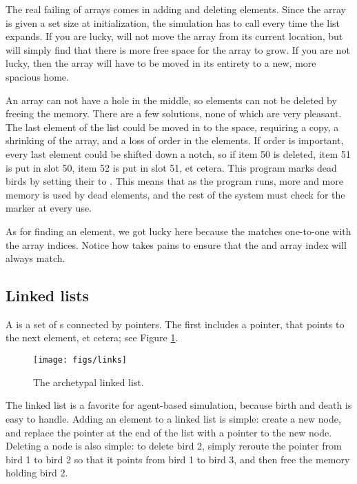 The real failing of arrays comes in adding and deleting elements. Since
the array is given a set size at initialization,
the simulation has to call  every time the
list expands. If you are lucky,  will not move the array
from its current location, but will simply find that there is more free
space for the array to grow. If you are not lucky, then the array will
have to be moved in its entirety to a new, more spacious home.

An array can not have a hole in the middle, so elements can not be
deleted by freeing the memory. There are a few solutions, none of which
are very pleasant. The last element of the list could be moved in to the
space, requiring a copy, a shrinking of the array, and a loss of order
in the elements. If order is important, every last element could be
shifted down a notch, so if item 50 is deleted, item 51 is put in slot
50, item 52 is put in slot 51, et cetera. This program marks dead birds
by setting their  to . This means that as the program runs,
more and more memory is used by dead elements, and the rest of the system
must check for the marker at every use.

As for finding an element, we got lucky here because the  
matches one-to-one with the array indices. Notice how
 takes pains to ensure that the  and array
index will always match.


\subsection{Linked lists} A  is a set of s connected
by pointers. The first  includes a  pointer, that
points to the next element, et cetera; see Figure \ref{listfig}.

\begin{figure}[htb]
\begin{center}
\texttt{[image: figs/links]}
\end{center}
\caption{The archetypal linked list.}
\label{listfig}
\end{figure}

The linked list is a favorite for agent-based simulation, because birth
and death is easy to handle.  Adding an element to a linked list is
simple: create a new node, and replace the  pointer at
the end of the list with a pointer to the new node. Deleting a node is also simple:
to delete bird 2, simply reroute the  pointer from bird 1 to bird 2 so
that it points from bird 1 to bird 3, and then free the memory holding
bird 2.

